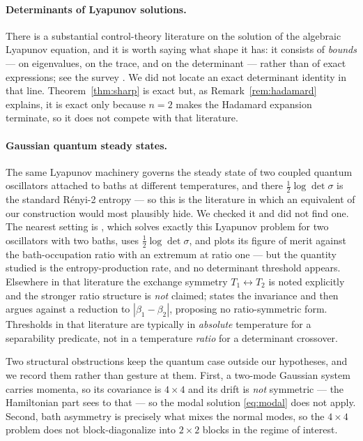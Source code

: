 \documentclass[11pt]{article}
\theoremstyle{plain}
\theoremstyle{definition}
\theoremstyle{remark}
\begin{document}
\paragraph{Determinants of Lyapunov solutions.} There is a substantial control-theory
literature on the solution of the algebraic Lyapunov equation, and it is worth saying what shape
it has: it consists of \emph{bounds} --- on eigenvalues, on the trace, and on the determinant ---
rather than of exact expressions; see the survey \cite{KwonEtAl1996}. We did not locate an exact
determinant identity in that line. Theorem~\ref{thm:sharp} is exact but, as
Remark~\ref{rem:hadamard} explains, it is exact only because $n=2$ makes the Hadamard expansion
terminate, so it does not compete with that literature.

\paragraph{Gaussian quantum steady states.} The same Lyapunov machinery governs the steady
state of two coupled quantum oscillators attached to baths at different temperatures, and there
$\tfrac12\log\det\sigma$ is the standard R\'enyi-2 entropy --- so this is the literature in which
an equivalent of our construction would most plausibly hide. We checked it and did not find one.
The nearest setting is \cite{BrunelliPaternostro2016}, which solves exactly this Lyapunov problem
for two oscillators with two baths, uses $\tfrac12\log\det\sigma$, and plots its figure of merit
against the bath-occupation ratio with an extremum at ratio one --- but the quantity studied is
the entropy-production rate, and no determinant threshold appears. Elsewhere in that literature
the exchange symmetry $T_1\leftrightarrow T_2$ is noted explicitly and the stronger ratio
structure is \emph{not} claimed; \cite[\S\,discussion of Fig.~5]{HsiangHu2015} states the
invariance and then argues against a reduction to $|\beta_1-\beta_2|$, proposing no
ratio-symmetric form. Thresholds in that literature are typically in \emph{absolute} temperature
for a separability predicate, not in a temperature \emph{ratio} for a determinant crossover.

Two structural obstructions keep the quantum case outside our hypotheses, and we record them
rather than gesture at them. First, a two-mode Gaussian system carries momenta, so its covariance
is $4\times4$ and its drift is \emph{not} symmetric --- the Hamiltonian part sees to that --- so
the modal solution \eqref{eq:modal} does not apply. Second, bath asymmetry is precisely what
mixes the normal modes, so the $4\times4$ problem does not block-diagonalize into $2\times2$
blocks in the regime of interest.
\end{document}
